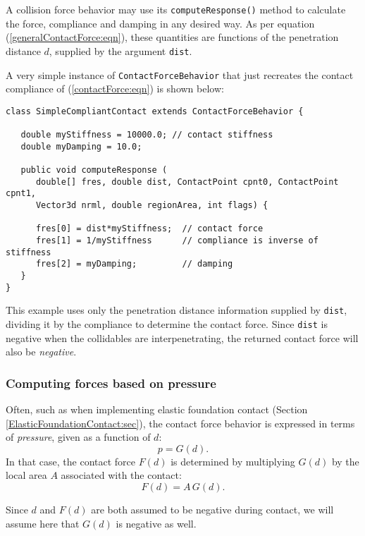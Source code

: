 A collision force behavior may use its {\tt computeResponse()} method
to calculate the force, compliance and damping in any desired way. As
per equation (\ref{generalContactForce:eqn}), these quantities are
functions of the penetration distance $d$, supplied by the argument
{\tt dist}.

A very simple instance of {\tt ContactForceBehavior} that just
recreates the contact compliance of (\ref{contactForce:eqn})
is shown below:
%
\begin{lstlisting}[]
class SimpleCompliantContact extends ContactForceBehavior {

   double myStiffness = 10000.0; // contact stiffness
   double myDamping = 10.0;

   public void computeResponse (
      double[] fres, double dist, ContactPoint cpnt0, ContactPoint cpnt1, 
      Vector3d nrml, double regionArea, int flags) {

      fres[0] = dist*myStiffness;  // contact force
      fres[1] = 1/myStiffness      // compliance is inverse of stiffness
      fres[2] = myDamping;         // damping
   }
}
\end{lstlisting}
%
This example uses only the penetration distance information supplied
by {\tt dist}, dividing it by the compliance to determine the contact
force. Since {\tt dist} is negative when the collidables are
interpenetrating, the returned contact force will also be {\it
negative}.

\subsubsection{Computing forces based on pressure}
\label{pressureBasedContact:sec}

Often, such as when implementing elastic foundation contact
(Section \ref{ElasticFoundationContact:sec}), the contact force
behavior is expressed in terms of {\it pressure}, given as a
function of $d$:
%
\begin{equation}
p = G (d).
\end{equation}
%
In that case, the contact force $F(d)$ is determined by multiplying
$G(d)$ by the local area $A$ associated with the contact:
%
\begin{equation}
F(d) = A \, G(d).
\end{equation}
%
\begin{sideblock}
Since $d$ and $F(d)$ are both assumed to be negative during contact,
we will assume here that $G(d)$ is negative as well.
\end{sideblock}

